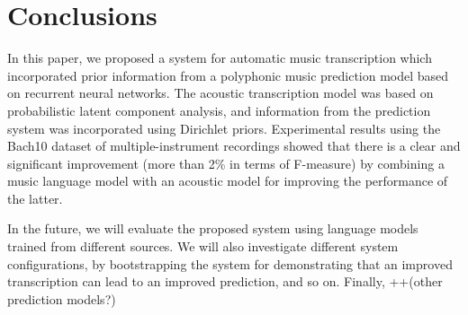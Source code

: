 \section{Conclusions} \label{sec:conclusions}

In this paper, we proposed a system for automatic music transcription which incorporated prior information from a polyphonic music prediction model based on recurrent neural networks. The acoustic transcription model was based on probabilistic latent component analysis, and information from the prediction system was incorporated using Dirichlet priors. Experimental results using the Bach10 dataset of multiple-instrument recordings showed that there is a clear and significant improvement (more than 2\% in terms of F-measure) by combining a music language model with an acoustic model for improving the performance of the latter.

In the future, we will evaluate the proposed system using language models trained from different sources. We will also investigate different system configurations, by bootstrapping the system for demonstrating that an improved transcription can lead to an improved prediction, and so on. Finally, ++(other prediction models?) 